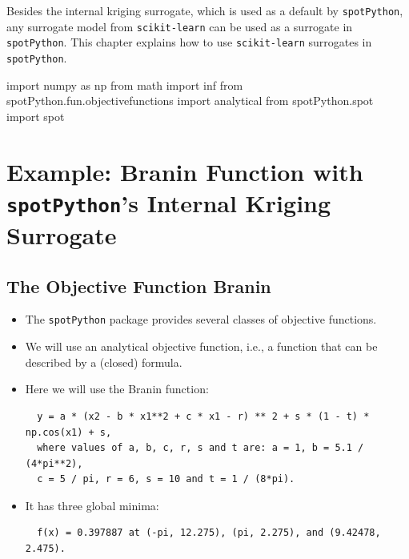 \documentclass[
  letterpaper,
  DIV=11,
  numbers=noendperiod]{scrreprt}
\newenvironment{Shaded}{\begin{snugshade}}{\end{snugshade}}
\newcommand{\ImportTok}[1]{\textcolor[rgb]{0.00,0.46,0.62}{#1}}
\newcommand{\NormalTok}[1]{\textcolor[rgb]{0.00,0.23,0.31}{#1}}
\begin{document}
Besides the internal kriging surrogate, which is used as a default by
\texttt{spotPython}, any surrogate model from \texttt{scikit-learn} can
be used as a surrogate in \texttt{spotPython}. This chapter explains how
to use \texttt{scikit-learn} surrogates in \texttt{spotPython}.

\begin{Shaded}
\begin{Highlighting}[]
\ImportTok{import}\NormalTok{ numpy }\ImportTok{as}\NormalTok{ np}
\ImportTok{from}\NormalTok{ math }\ImportTok{import}\NormalTok{ inf}
\ImportTok{from}\NormalTok{ spotPython.fun.objectivefunctions }\ImportTok{import}\NormalTok{ analytical}
\ImportTok{from}\NormalTok{ spotPython.spot }\ImportTok{import}\NormalTok{ spot}
\end{Highlighting}
\end{Shaded}

\section{\texorpdfstring{Example: Branin Function with
\texttt{spotPython}'s Internal Kriging
Surrogate}{Example: Branin Function with spotPython's Internal Kriging Surrogate}}\label{example-branin-function-with-spotpythons-internal-kriging-surrogate}

\subsection{The Objective Function
Branin}\label{the-objective-function-branin-1}

\begin{itemize}
\item
  The \texttt{spotPython} package provides several classes of objective
  functions.
\item
  We will use an analytical objective function, i.e., a function that
  can be described by a (closed) formula.
\item
  Here we will use the Branin function:

\begin{verbatim}
  y = a * (x2 - b * x1**2 + c * x1 - r) ** 2 + s * (1 - t) * np.cos(x1) + s,
  where values of a, b, c, r, s and t are: a = 1, b = 5.1 / (4*pi**2),
  c = 5 / pi, r = 6, s = 10 and t = 1 / (8*pi).
\end{verbatim}
\item
  It has three global minima:

\begin{verbatim}
  f(x) = 0.397887 at (-pi, 12.275), (pi, 2.275), and (9.42478, 2.475).
\end{verbatim}
\end{itemize}
\end{document}
